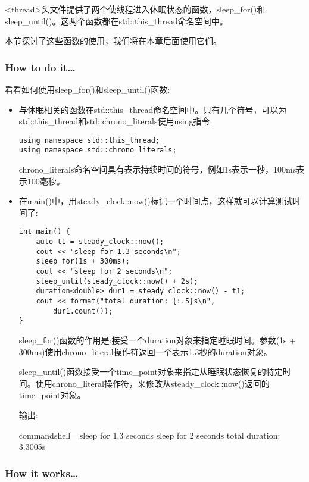 
<thread>头文件提供了两个使线程进入休眠状态的函数，sleep\_for()和sleep\_until()。这两个函数都在std::this\_thread命名空间中。

本节探讨了这些函数的使用，我们将在本章后面使用它们。

\subsubsection{How to do it…}

看看如何使用sleep\_for()和sleep\_until()函数:

\begin{itemize}
\item 
与休眠相关的函数在std::this\_thread命名空间中。只有几个符号，可以为std::this\_thread和std::chrono\_literals使用using指令:

\begin{lstlisting}[style=styleCXX]
using namespace std::this_thread;
using namespace std::chrono_literals;
\end{lstlisting}

chrono\_literals命名空间具有表示持续时间的符号，例如1s表示一秒，100ms表示100毫秒。

\item 
在main()中，用steady\_clock::now()标记一个时间点，这样就可以计算测试时间了:

\begin{lstlisting}[style=styleCXX]
int main() {
	auto t1 = steady_clock::now();
	cout << "sleep for 1.3 seconds\n";
	sleep_for(1s + 300ms);
	cout << "sleep for 2 seconds\n";
	sleep_until(steady_clock::now() + 2s);
	duration<double> dur1 = steady_clock::now() - t1;
	cout << format("total duration: {:.5}s\n",
		dur1.count());
}
\end{lstlisting}

sleep\_for()函数的作用是:接受一个duration对象来指定睡眠时间。参数(1s + 300ms)使用chrono\_literal操作符返回一个表示1.3秒的duration对象。

sleep\_until()函数接受一个time\_point对象来指定从睡眠状态恢复的特定时间。使用chrono\_literal操作符，来修改从steady\_clock::now()返回的time\_point对象。

输出:

\begin{tcblisting}{commandshell={}}
sleep for 1.3 seconds
sleep for 2 seconds
total duration: 3.3005s
\end{tcblisting}

\end{itemize}

\subsubsection{How it works…}

